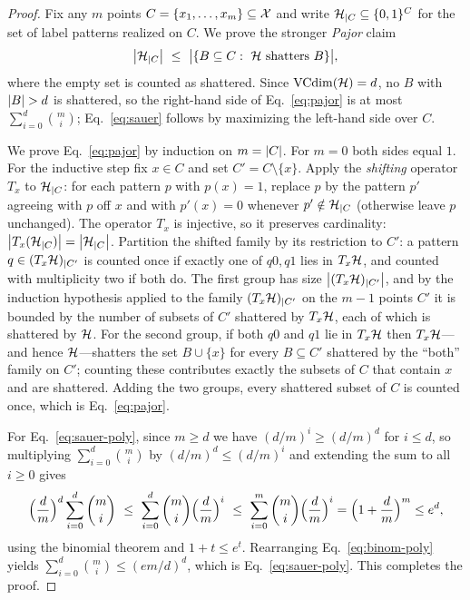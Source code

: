 \begin{proof}
Fix any $m$ points $C=\{x_1,\dots,x_m\}\subseteq\mathcal{X}$ and write
$\mathcal{H}_{|C}\subseteq\{0,1\}^{C}$ for the set of label patterns realized on $C$.
We prove the stronger \emph{Pajor} claim
\begin{align}\label{eq:pajor}
\left| \mathcal{H}_{|C} \right|\ \le\ \bigl|\{B\subseteq C:\ \mathcal{H}\text{ shatters }B\}\bigr|,
\end{align}
where the empty set is counted as shattered. Since $\operatorname{VCdim}(\mathcal{H})=d$, no $B$ with
$\abs{B}>d$ is shattered, so the right-hand side of Eq.~\eqref{eq:pajor} is at most
$\sum_{i=0}^{d}\binom{m}{i}$; Eq.~\eqref{eq:sauer} follows by maximizing the
left-hand side over $C$.

We prove Eq.~\eqref{eq:pajor} by induction on $m=\left| C \right|$. For $m=0$ both sides equal
$1$. For the inductive step fix $x\in C$ and set $C'=C\setminus\{x\}$. Apply the
\emph{shifting} operator $T_x$ to $\mathcal{H}_{|C}$: for each pattern $p$ with
$p(x)=1$, replace $p$ by the pattern $p'$ agreeing with $p$ off $x$ and with
$p'(x)=0$ whenever $p'\notin\mathcal{H}_{|C}$ (otherwise leave $p$ unchanged). The
operator $T_x$ is injective, so it preserves cardinality:
$\left| T_x(\mathcal{H}_{|C}) \right|=\left| \mathcal{H}_{|C} \right|$. Partition the shifted family by its
restriction to $C'$: a pattern $q\in(T_x\mathcal{H})_{|C'}$ is counted once if exactly
one of $q0,q1$ lies in $T_x\mathcal{H}$, and counted with multiplicity two if both do.
The first group has size $\left| (T_x\mathcal{H})_{|C'} \right|$, and by the induction
hypothesis applied to the family $(T_x\mathcal{H})_{|C'}$ on the $m-1$ points $C'$ it
is bounded by the number of subsets of $C'$ shattered by $T_x\mathcal{H}$, each of
which is shattered by $\mathcal{H}$. For the second group, if both $q0$ and $q1$ lie
in $T_x\mathcal{H}$ then $T_x\mathcal{H}$---and hence $\mathcal{H}$---shatters the set $B\cup\{x\}$
for every $B\subseteq C'$ shattered by the ``both'' family on $C'$; counting
these contributes exactly the subsets of $C$ that contain $x$ and are shattered.
Adding the two groups, every shattered subset of $C$ is counted once, which is
Eq.~\eqref{eq:pajor}.

For Eq.~\eqref{eq:sauer-poly}, since $m\ge d$ we have $(d/m)^{i}\ge(d/m)^{d}$ for
$i\le d$, so multiplying $\sum_{i=0}^{d}\binom{m}{i}$ by
$(d/m)^{d}\le(d/m)^{i}$ and extending the sum to all $i\ge0$ gives
\begin{align}\label{eq:binom-poly}
\Bigl(\frac{d}{m}\Bigr)^{d}\sum_{i=0}^{d}\binom{m}{i}
\ \le\ \sum_{i=0}^{d}\binom{m}{i}\Bigl(\frac{d}{m}\Bigr)^{i}
\ \le\ \sum_{i=0}^{m}\binom{m}{i}\Bigl(\frac{d}{m}\Bigr)^{i}
=\Bigl(1+\frac{d}{m}\Bigr)^{m}
\le e^{d},
\end{align}
using the binomial theorem and $1+t\le e^{t}$. Rearranging
Eq.~\eqref{eq:binom-poly} yields $\sum_{i=0}^{d}\binom{m}{i}\le(em/d)^{d}$, which is
Eq.~\eqref{eq:sauer-poly}. This completes the proof.
\end{proof}

